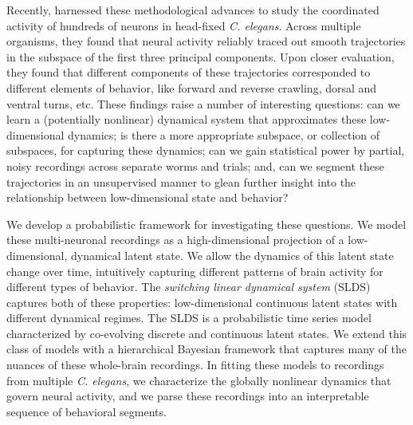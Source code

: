 \documentclass{article}
\newcommand{\celegans}{\textit{C. elegans}}
\begin{document}
Recently, \citet{kato2015global} harnessed these methodological
advances to study the coordinated activity of hundreds of neurons
in head-fixed \celegans. Across multiple organisms, they found that
neural activity reliably traced out smooth trajectories in the subspace
of the first three principal components.
Upon closer evaluation, they found that different components of these
trajectories corresponded to different elements of behavior, like
forward and reverse crawling, dorsal and ventral turns, etc. These
findings raise a number of interesting questions: can we learn a
(potentially nonlinear) dynamical system that approximates these
low-dimensional dynamics; is there a more appropriate subspace, or
collection of subspaces, for capturing these dynamics; can we gain
statistical power by partial, noisy recordings across separate worms
and trials; and, can we segment these trajectories in an unsupervised
manner to glean further insight into the relationship between
low-dimensional state and behavior?

We develop a probabilistic framework for investigating these
questions.  We model these multi-neuronal recordings as a
high-dimensional projection of a low-dimensional, dynamical latent
state.  We allow the dynamics of this latent state change over time,
intuitively capturing different patterns of brain activity for
different types of behavior.  The \emph{switching linear dynamical
  system} (SLDS) \citep{chang1978state, ackerson1970state,
  hamilton1990analysis, ghahramani1996switching, murphy1998switching}
captures both of these properties: low-dimensional continuous latent
states with different dynamical regimes.  The SLDS is a probabilistic
time series model characterized by co-evolving discrete and continuous
latent states.  We extend this class of models with a hierarchical
Bayesian framework that captures many of the nuances of these
whole-brain recordings. In fitting these models to recordings from
multiple \celegans, we characterize the globally nonlinear dynamics
that govern neural activity, and we parse these recordings into an
interpretable sequence of behavioral segments.

\end{document}
